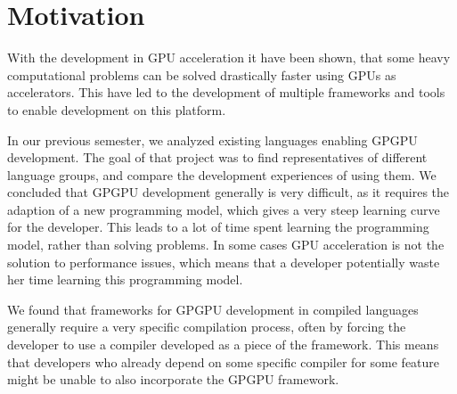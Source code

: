 \section{Motivation}\label{cha:motivation}
With the development in GPU acceleration it have been shown, that some heavy computational problems can be solved drastically faster using GPUs as accelerators. This have led to the development of multiple frameworks and tools to enable development on this platform.

In our previous semester\cite{sw9Report}, we analyzed existing languages enabling GPGPU development. The goal of that project was to find representatives of different language groups, and compare the development experiences of using them. We concluded that GPGPU development generally is very difficult, as it requires the adaption of a new programming model, which gives a very steep learning curve for the developer. This leads to a lot of time spent learning the programming model, rather than solving problems. In some cases GPU acceleration is not the solution to performance issues, which means that a developer potentially waste her time learning this programming model.

We found that frameworks for GPGPU development in compiled languages generally require a very specific compilation process, often by forcing the developer to use a compiler developed as a piece of the framework. This means that developers who already depend on some specific compiler for some feature might be unable to also incorporate the GPGPU framework.




